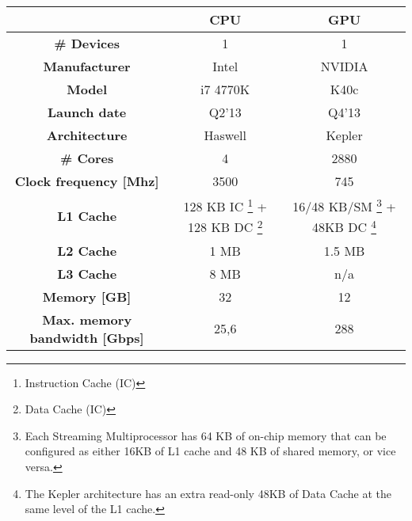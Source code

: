 \begin{minipage}[h]{\hsize}
	\centering
	\begin{tabular}{ccc}
		\toprule[2pt]
												 & \textbf{CPU}      & \textbf{GPU} \\ \midrule
		\textbf{\# Devices}                      & 1                 & 1            \\ 
		\textbf{Manufacturer}                    & Intel             & NVIDIA       \\ 
		\textbf{Model}                           & i7 4770K          & K40c      \\ 
		\textbf{Launch date}                     & Q2'13             & Q4'13      \\ 
		\textbf{Architecture}                    & Haswell      & Kepler        \\ 
		\textbf{\# Cores}                        & 4                 & 2880           \\ 
		\textbf{Clock frequency {[}Mhz{]}}       & 3500              & 745         \\ 
		\textbf{L1 Cache}                        & 128 KB IC \footnote{Instruction Cache (IC)} + 128 KB DC \footnote{Data Cache (IC)} & 16/48 KB/SM \footnote{Each Streaming Multiprocessor has 64 KB of on-chip memory that can be configured as either 16KB of L1 cache and 48 KB of shared memory, or vice versa.} + 48KB DC \footnote{The Kepler architecture has an extra read-only 48KB of Data Cache at the same level of the L1 cache.} \\ 
		\textbf{L2 Cache}                        & 1 MB             & 1.5 MB         \\ 
		\textbf{L3 Cache}                        & 8 MB              & n/a          \\ 
		\textbf{Memory {[}GB{]}}                 & 32                & 12            \\ 
		\textbf{Max. memory bandwidth {[}Gbps{]}} & 25,6              & 288        \\ 
		\bottomrule[2pt]
	\end{tabular}
	\label{tab:charlie}
\end{minipage}